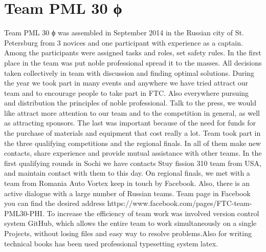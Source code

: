 
\section{Team PML 30 ϕ} 
		Team PML 30 ϕ was assembled in September 2014 in  the Russian city of St. Petersburg from 3 novices and one participant with experience as a captain. Among the participants were assigned tasks and roles, set safety rules. In the first place in the team was put noble professional spread it to the masses.  All decisions taken collectively in team with discussion and finding optimal solutions. 
		During the year we took part in many events and anywhere we have tried attract our team and to encourage people to take part in FTC. Also everywhere pursuing and distribution the principles of noble professional. Talk to the press, we would like attract more attention to our team and to the competition in general, as well as attracting sponsors. The last was important because of the need for funds for the purchase of materials and equipment that cost really a lot.
		Team took part in the three qualifying competitions and the regional finals. In all of them make new contacts, share experience and provide mutual assistance with other teams. In the first qualifying rounds in Sochi we have contacts Stuy  fission 310 team from USA, and maintain contact with them to this day. On regional finals, we met with a team from Romania Auto Vortex keep in touch by Facebook. Also, there is an active dialogue with a large number of Russian teams. Team page in Facebook you can find the desired address https://www.facebook.com/pages/FTC-team-PML30-PHI.
	    To increase the efficiency of team work was involved version control system GitHub, which allows the entire team to work simultaneously on a single Projects, without losing files and easy way to resolve problems.Also for writing technical books has been used professional typesetting system latex.
	    \\
